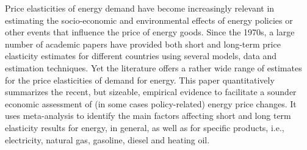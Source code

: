 Price elasticities of energy demand have become increasingly relevant in estimating the socio-economic and environmental effects of energy policies or other events that influence the price of energy goods. Since the 1970s, a large number of academic papers have provided both short and long-term price elasticity estimates for different countries using several models, data and estimation techniques. Yet the literature offers a rather wide range of estimates for the price elasticities of demand for energy. This paper quantitatively summarizes the recent, but sizeable, empirical evidence to facilitate a sounder economic assessment of (in some cases policy-related) energy price changes. It uses meta-analysis to identify the main factors affecting short and long term elasticity results for energy, in general, as well as for specific products, i.e., electricity, natural gas, gasoline, diesel and heating oil.